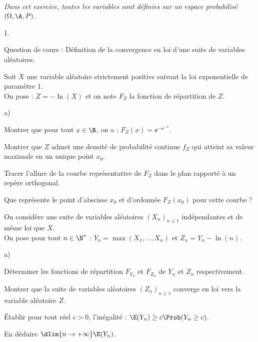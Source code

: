 \documentclass[11pt]{article}%
\begin{document}
\begin{exerciceAP}~\\
  {\it Dans cet exercice, toutes les variables sont définies sur un
    espace probabilisé $(\Omega,\A,P)$.}
  \begin{noliste}{1.}
    \setlength{\itemsep}{2mm}
  \item Question de cours : Définition de la convergence en loi d'une
    suite de variables aléatoires.
  \item Soit $X$ une variable aléatoire strictement positive suivant
    la loi exponentielle de paramètre $1$.\\
    On pose : $Z=-\ln(X)$ et on note $F_Z$ la fonction de répartition
    de $Z$.
    \begin{noliste}{a)}
    \setlength{\itemsep}{2mm}
    \item Montrer que pour tout $x\in\R$, on a :
      $F_Z(x)=\ee^{-\ee^{-x}}$.
    \item Montrer que $Z$ admet une densité de probabilité continue
      $f_Z$ qui atteint sa valeur maximale en un unique point $x_0$.
    \item Tracer l'allure de la courbe représentative de $F_Z$ dans le
      plan rapporté à un repère orthogonal.
    \item Que représente le point d'abscisse $x_0$ et d'ordonnée
      $F_Z(x_0)$ pour cette courbe ?
    \end{noliste}
  \item On considère une suite de variables aléatoires $(X_n)_{n\geq
      1}$ indépendantes et de même loi que $X$.\\
    On pose pour tout $n\in\N^*$ : $Y_n=\max(X_1,\hdots,X_n)$ et
    $Z_n=Y_n-\ln(n)$.
    \begin{noliste}{a)}
    \setlength{\itemsep}{2mm}
    \item Déterminer les fonctions de répartition $F_{Y_n}$ et
      $F_{Z_n}$ de $Y_n$ et $Z_n$ respectivement.
    \item Montrer que la suite de variables aléatoires $(Z_n)_{n\geq
        1}$ converge en loi vers la variable aléatoire $Z$.
    \item Établir pour tout réel $c>0$, l'inégalité : $\E(Y_n)\geq
      c\Prob(Y_n\geq c)$.
    \item En déduire $\dlim{n\to+\infty} \E(Y_n)$.
    \end{noliste}
  \end{noliste}
\end{exerciceAP}
\end{document}
